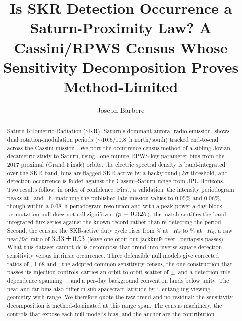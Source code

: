 \documentclass[twocolumn]{aastex631}
\begin{document}
\title{Is SKR Detection Occurrence a Saturn-Proximity Law? A Cassini/RPWS Census
Whose Sensitivity Decomposition Proves Method-Limited}
\author[0009-0008-3289-4447]{Joseph Barbere}

\begin{abstract}
Saturn Kilometric Radiation (SKR), Saturn's dominant auroral radio emission, shows dual
rotation-modulation periods ($\sim$10.6/10.8~h north/south) tracked end-to-end across the
Cassini mission \citep{gurnett2009,fischer2015,ye2016,provan2019}. We port the occurrence-census
method of a sibling Jovian-decametric study to Saturn, using \skrNBins\ one-minute RPWS
key-parameter bins from the 2017 proximal (Grand Finale) orbits: the electric spectral density is
band-integrated over the SKR band, bins are flagged SKR-active by a background$+k\sigma$
threshold, and detection occurrence is folded against the Cassini--Saturn range from JPL Horizons.
Two results follow, in order of confidence. First, a validation: the intensity periodogram
peaks at \skrRealAnchorPeriod\ and \skrRealPeriodTwo~h, matching the published late-mission
values \citep{provan2019} to 0.05\% and 0.06\%, though within a 0.08~h periodogram resolution
and with a peak power a day-block permutation null does not call significant
($p=0.325$); the match certifies the band-integrated flux series against the known
record rather than re-detecting the period. Second, the census: the SKR-active duty cycle rises
from \skrRealDutyFar\% at \skrRealRangeFar~$R_S$ to \skrRealDutyNear\% at
\skrRealRangeNear~$R_S$, a raw near/far ratio of $3.33\pm0.93$
(leave-one-orbit-out jackknife over \skrRealNOrbits\ periapsis passes). What this dataset
cannot do is decompose that trend into inverse-square detection sensitivity versus intrinsic
occurrence. Three defensible null models give corrected ratios of
\skrRealCorrNearFarFluxScaled, 1.68 and \skrRealSensCorrNearFar; the adopted
common-sensitivity census, the one construction that passes its injection controls, carries an
orbit-to-orbit scatter of $\pm$\skrRealCorrNearFarJkSe\ and a detection-rule dependence
spanning \skrRealSweepMin--\skrRealSweepMax, and a per-day background convention lands below
unity. The near and far bins also differ in sub-spacecraft latitude by
\skrRealAbsLatSpan$^\circ$, entangling viewing geometry with range. We therefore quote the raw
trend and no residual: the sensitivity decomposition is method-dominated at this range span. The
census machinery, the controls that expose each null model's bias, and the anchor are the
contribution.
\end{abstract}
\end{document}
